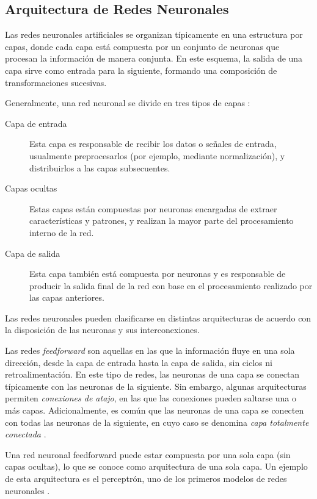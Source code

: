 \subsection{Arquitectura de Redes Neuronales}
Las redes neuronales artificiales se organizan típicamente en una estructura por capas,
donde cada capa está compuesta por un conjunto de neuronas que procesan la información
de manera conjunta. En este esquema, la salida de una capa sirve como entrada para la
siguiente, formando una composición de transformaciones sucesivas.
\medskip

Generalmente, una red neuronal se divide en tres tipos de capas \parencite[p.21]{da2016artificial}:
\begin{description}
    \item[Capa de entrada] Esta capa es responsable de recibir los datos o señales de entrada,
    usualmente preprocesarlos (por ejemplo, mediante normalización), y distribuirlos a las
    capas subsecuentes.
    
    \item[Capas ocultas] Estas capas están compuestas por neuronas encargadas de extraer
    características y patrones, y realizan la mayor parte del procesamiento interno de la red.
    
    \item[Capa de salida] Esta capa también está compuesta por neuronas y es responsable
    de producir la salida final de la red con base en el procesamiento realizado por las
    capas anteriores.
\end{description}
\medskip

Las redes neuronales pueden clasificarse en distintas arquitecturas de acuerdo con la
disposición de las neuronas y sus interconexiones.
\medskip

Las redes \textit{feedforward} son aquellas en las que la información fluye en una sola
dirección, desde la capa de entrada hasta la capa de salida, sin ciclos ni retroalimentación.
En este tipo de redes, las neuronas de una capa se conectan típicamente con las neuronas
de la siguiente. Sin embargo, algunas arquitecturas permiten \textit{conexiones de atajo},
en las que las conexiones pueden saltarse una o más capas. Adicionalmente, es común que
las neuronas de una capa se conecten con todas las neuronas de la siguiente, en cuyo caso
se denomina \textit{capa totalmente conectada} \parencite[pp.~39--40]{Kriesel2007NeuralNetworks}.
\medskip

Una red neuronal feedforward puede estar compuesta por una sola capa (sin capas ocultas),
lo que se conoce como arquitectura de una sola capa. Un ejemplo de esta arquitectura es
el perceptrón, uno de los primeros modelos de redes neuronales \parencite[p.22]{da2016artificial}.
\medskip

